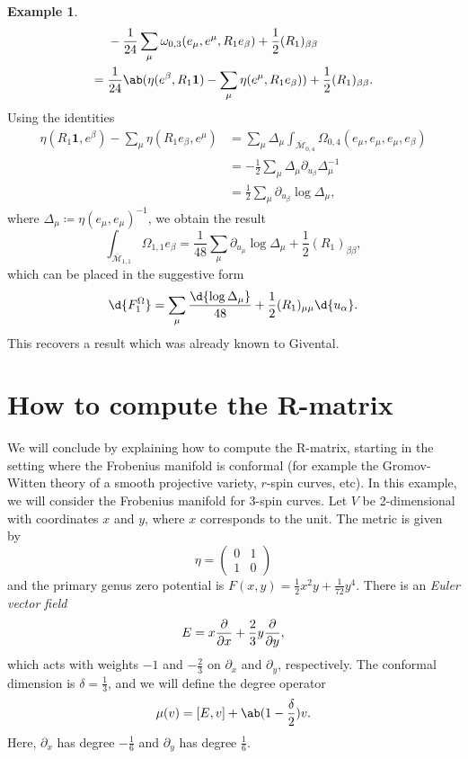 \documentclass{amsart}
\theoremstyle{definition}
\newtheorem{exm}[thm]{Example}
\theoremstyle{remark}
\theoremstyle{plain}
\theoremstyle{definition}
\theoremstyle{remark}
\newcommand{\Mbar}{\overline{\mathcal{M}}}
\newcommand{\1}{\mathbf{1}}
\newcommand{\2}{\mathbf{2}}
\newcommand{\3}{\mathbf{3}}
\begin{document}
\begin{exm}
\begin{align*}
        &-\frac{1}{24} \sum_{\mu} \omega_{0,3}(e_{\mu}, e^{\mu}, R_1 e_{\beta}) + \frac{1}{2} (R_1)_{\beta\beta} \\
        ={}& \frac{1}{24} \ab(\eta(e^{\beta}, R_1 \1) - \sum_{\mu} \eta(e^{\mu}, R_1 e_{\beta})) + \frac{1}{2} (R_1)_{\beta\beta}.
    \end{align*}
    Using the identities
    \begin{align*}
        \eta(R_1 \1, e^{\beta}) - \sum_{\mu} \eta(R_1 e_{\beta}, e^{\mu}) &= \sum_{\mu} \Delta_{\mu} \int_{\Mbar_{0,4}} \Omega_{0,4}(e_{\mu}, e_{\mu}, e_{\mu}, e_{\beta}) \\
        &= -\frac{1}{2}\sum_{\mu} \Delta_{\mu} \partial_{u_{\beta}} \Delta_{\mu}^{-1} \\
        &= \frac{1}{2} \sum_{\mu} \partial_{u_{\beta}} \log \Delta_{\mu},
    \end{align*}
    where $\Delta_{\mu} \coloneqq \eta(e_{\mu}, e_{\mu})^{-1}$, we obtain the result
    \[ \int_{\Mbar_{1,1}} \Omega_{1,1} e_{\beta} = \frac{1}{48} \sum_{\mu} \partial_{u_{\mu}} \log \Delta_{\mu} + \frac{1}{2} (R_1)_{\beta\beta}, \]
    which can be placed in the suggestive form
    \[ \d{F_1^{\Omega}} = \sum_{\mu} \frac{\d{\log \Delta_{\mu}}}{48} + \frac{1}{2} (R_1)_{\mu\mu} \d{u_{\alpha}}. \]
    This recovers a result which was already known to Givental.
\end{exm}

\section{How to compute the R-matrix}%
\label{sec:How to compute the R-matrix}

We will conclude by explaining how to compute the R-matrix, starting in the setting where the Frobenius manifold is conformal (for example the Gromov-Witten theory of a smooth projective variety, \(r\)-spin curves, etc). In this example, we will consider the Frobenius manifold for 3-spin curves. Let \(V\) be 2-dimensional with coordinates \(x\) and \(y\), where \(x\) corresponds to the unit. The metric is given by
\[ \eta = \begin{pmatrix}
    0 & 1 \\
    1 & 0
\end{pmatrix} \]
and the primary genus zero potential is \(F(x,y) = \frac{1}{2} x^2 y + \frac{1}{72} y^4\). There is an \textit{Euler vector field}
\[ E = x \pdv{}{x} + \frac{2}{3} y \pdv{}{y}, \]
which acts with weights \(-1\) and \(-\frac{2}{3}\) on \(\partial_x\) and \(\partial_y\), respectively. The conformal dimension is \(\delta = \frac{1}{3}\), and we will define the degree operator
\[ \mu(v) = [E,v] + \ab(1 - \frac{\delta}{2})v. \]
Here, \(\partial_x\) has degree \(-\frac{1}{6}\) and \(\partial_y\) has degree \(\frac{1}{6}\).
\end{document}
